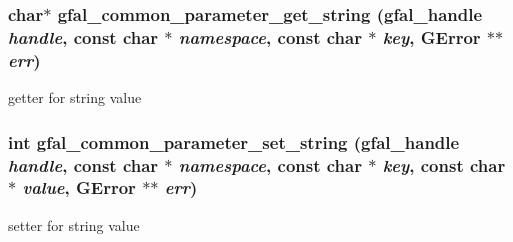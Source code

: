 \subsubsection{\setlength{\rightskip}{0pt plus 5cm}char$\ast$ gfal\_\-common\_\-parameter\_\-get\_\-string (gfal\_\-handle {\em handle}, const char $\ast$ {\em namespace}, const char $\ast$ {\em key}, GError $\ast$$\ast$ {\em err})}\label{gfal__common__parameter_8c_21177481b78f4ed95ac7cb7904e79f93}


getter for string value 
\subsubsection{\setlength{\rightskip}{0pt plus 5cm}int gfal\_\-common\_\-parameter\_\-set\_\-string (gfal\_\-handle {\em handle}, const char $\ast$ {\em namespace}, const char $\ast$ {\em key}, const char $\ast$ {\em value}, GError $\ast$$\ast$ {\em err})}\label{gfal__common__parameter_8c_7600e15a62b68dd3a88db707e9081c87}


setter for string value 